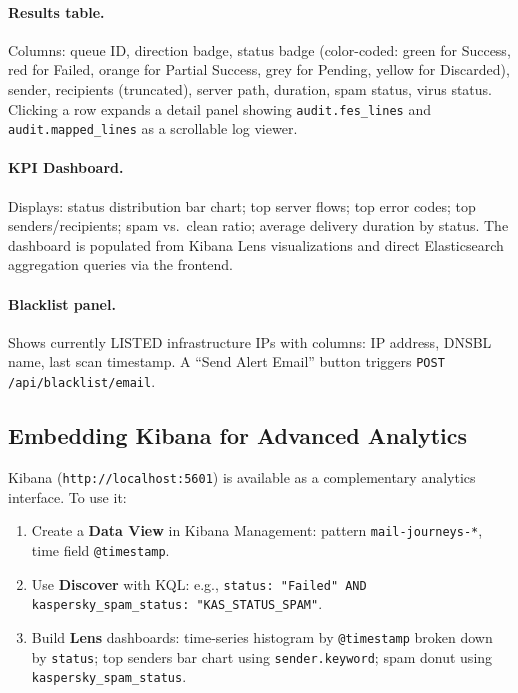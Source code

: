 \documentclass[12pt,a4paper,oneside]{report}
\begin{document}
\paragraph{Results table.}
Columns: queue ID, direction badge, status badge (color-coded: green for Success, red for Failed, orange for Partial Success, grey for Pending, yellow for Discarded), sender, recipients (truncated), server path, duration, spam status, virus status.
Clicking a row expands a detail panel showing \texttt{audit.fes\_lines} and \texttt{audit.mapped\_lines} as a scrollable log viewer.

\paragraph{KPI Dashboard.}
Displays: status distribution bar chart; top server flows; top error codes; top senders/recipients; spam vs.\ clean ratio; average delivery duration by status.
The dashboard is populated from Kibana Lens visualizations and direct Elasticsearch aggregation queries via the frontend.

\paragraph{Blacklist panel.}
Shows currently LISTED infrastructure IPs with columns: IP address, DNSBL name, last scan timestamp.
A ``Send Alert Email'' button triggers \texttt{POST /api/blacklist/email}.

\subsection{Embedding Kibana for Advanced Analytics}

Kibana (\texttt{http://localhost:5601}) is available as a complementary analytics interface.
To use it:

\begin{enumerate}
  \item Create a \textbf{Data View} in Kibana Management: pattern \texttt{mail-journeys-*}, time field \texttt{@timestamp}.
  \item Use \textbf{Discover} with KQL: e.g., \texttt{status: "Failed" AND kaspersky\_spam\_status: "KAS\_STATUS\_SPAM"}.
  \item Build \textbf{Lens} dashboards: time-series histogram by \texttt{@timestamp} broken down by \texttt{status}; top senders bar chart using \texttt{sender.keyword}; spam donut using \texttt{kaspersky\_spam\_status}.
\end{enumerate}
\end{document}
